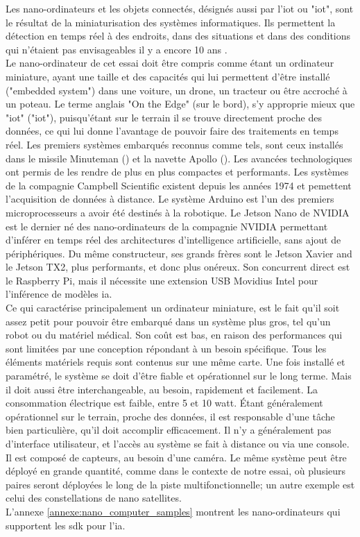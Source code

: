 ﻿\noindent Les nano-ordinateurs et les objets connectés, désignés aussi par l'\acrlong{iot} ou "\acrshort{iot}", \parencite{blanco-filgueira_deep_2019, sharma_history_2019} sont le résultat de la miniaturisation des systèmes informatiques. Ils permettent la détection en temps réel à des endroits, dans des situations et dans des conditions qui n'étaient pas envisageables il y a encore 10 ans \parencite{zheng_real-time_2020, bernas_edge_2017, abouzahir_iot-empowered_2017, blanco-filgueira_deep_2019}.
\vspace{0.5\baselineskip}
\\
\noindent Le nano-ordinateur de cet essai doit être compris comme étant un ordinateur miniature, ayant une taille et des capacités qui lui permettent d'être installé ("embedded system") dans une voiture, un drone, un tracteur ou être accroché à un poteau. Le terme anglais "On the Edge" (sur le bord), s'y approprie mieux que "\acrshort{iot}" ("\acrlong{iot}"), puisqu'étant sur le terrain il se trouve directement proche des données, ce qui lui donne l'avantage de pouvoir faire des traitements en temps réel. Les premiers systèmes embarqués reconnus comme tels, sont ceux installés dans le missile Minuteman (\parencite{kilby_nobel_2000}) et la navette Apollo (\parencite{kilby_nobel_2000}). Les avancées technologiques ont permis de les rendre de plus en plus compactes et performants. Les systèmes de la compagnie Campbell Scientific existent depuis les années 1974 et pemettent l'acquisition de données à distance. Le système Arduino est l'un des premiers microprocesseurs a avoir été destinés à la robotique. Le Jetson Nano de NVIDIA est le dernier né des nano-ordinateurs de la compagnie NVIDIA permettant d'inférer en temps réel des architectures d'intelligence artificielle, sans ajout de périphériques. Du même constructeur, ses grands frères sont le Jetson Xavier and le Jetson TX2, plus performants, et donc plus onéreux. Son concurrent direct est le Raspberry Pi, mais il nécessite une extension USB Movidius Intel pour l'inférence de modèles \acrshort{ia}. 
\vspace{0.5\baselineskip}
\\
\noindent Ce qui caractérise principalement un ordinateur miniature, est le fait qu'il soit assez petit pour pouvoir être embarqué dans un système plus gros, tel qu'un robot ou du matériel médical. Son coût est bas, en raison des performances qui sont limitées par une conception répondant à un besoin spécifique. Tous les éléments matériels requis sont contenus sur une même carte. Une fois installé et paramétré, le système se doit d'être fiable et opérationnel sur le long terme. Mais il doit aussi être interchangeable, au besoin, rapidement et facilement. La consommation électrique est faible, entre 5 et 10 watt. Étant généralement opérationnel sur le terrain, proche des données, il est responsable d'une tâche bien particulière, qu'il doit accomplir efficacement. Il n'y a généralement pas d'interface utilisateur, et l'accès au système se fait à distance ou via une console. Il est composé de capteurs, au besoin d'une caméra. Le même système peut être déployé en grande quantité, comme dans le contexte de notre essai, où plusieurs paires seront déployées le long de la piste multifonctionnelle; un autre exemple est celui des constellations de nano satellites.
\vspace{0.5\baselineskip}
\\
\noindent L'annexe \ref{annexe:nano_computer_samples} montrent les nano-ordinateurs qui supportent les \acrshort{sdk} pour l'\acrshort{ia}.
